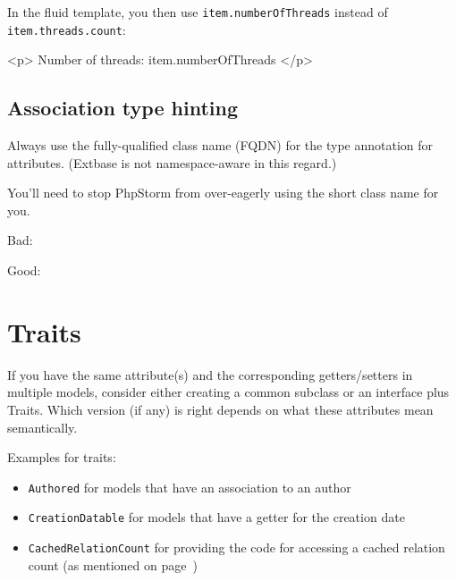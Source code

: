 In the fluid template, you then use \texttt{item.numberOfThreads} instead of \texttt{item.threads.count}:

\begin{htmlcode}
<p>
  Number of threads: {item.numberOfThreads}
</p>
\end{htmlcode}


\subsection{Association type hinting}
Always use the fully-qualified class name (FQDN) for the type annotation for attributes. (Extbase is not namespace-aware in this regard.)

You'll need to stop PhpStorm from over-eagerly using the short class name for you.

Bad:


Good:



\section{Traits}

If you have the same attribute(s) and the corresponding getters/setters in multiple models, consider either creating a common subclass or an interface plus Traits. Which version (if any) is right depends on what these attributes mean semantically.

Examples for traits:

\begin{itemize}
  \item \texttt{Authored} for models that have an association to an author
  \item \texttt{CreationDatable} for models that have a getter for the creation date
  \item \texttt{CachedRelationCount} for providing the code for accessing a cached relation count (as mentioned on page~\pageref{relation-count})
\end{itemize}
